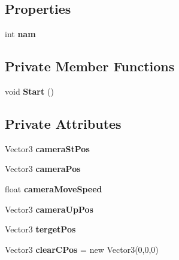 \subsection*{Properties}
\begin{DoxyCompactItemize}
\item 
\mbox{\label{class_camera_operation_a5a1c7546d88f48839015acd01bea6ea8}} 
int {\bfseries nam}
\end{DoxyCompactItemize}
\subsection*{Private Member Functions}
\begin{DoxyCompactItemize}
\item 
\mbox{\label{class_camera_operation_a039ab61e59c6875bca47873f2508ef6a}} 
void {\bfseries Start} ()
\end{DoxyCompactItemize}
\subsection*{Private Attributes}
\begin{DoxyCompactItemize}
\item 
\mbox{\label{class_camera_operation_af400a105ce6aba985060a12cf97a1d6c}} 
Vector3 {\bfseries camera\+St\+Pos}
\item 
\mbox{\label{class_camera_operation_aebae5a3deea2093f11eb5002274e2d2f}} 
Vector3 {\bfseries camera\+Pos}
\item 
\mbox{\label{class_camera_operation_aaab117f3af9c75f4802f0910ccc08612}} 
float {\bfseries camera\+Move\+Speed}
\item 
\mbox{\label{class_camera_operation_a644e7e472b3013b8440eb130c0274dcd}} 
Vector3 {\bfseries camera\+Up\+Pos}
\item 
\mbox{\label{class_camera_operation_a1ec1acd57e3dfa1b743fbf34e7650fb9}} 
Vector3 {\bfseries terget\+Pos}
\item 
\mbox{\label{class_camera_operation_a07459a4cb7357e52c66accdf45da88ed}} 
Vector3 {\bfseries clear\+C\+Pos} = new Vector3(0,0,0)
\end{DoxyCompactItemize}


